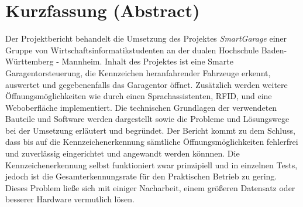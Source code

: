 \chapter*{Kurzfassung (Abstract)}

Der Projektbericht behandelt die Umsetzung des Projektes \textit{SmartGarage} einer Gruppe von Wirtschaftsinformatikstudenten an der dualen Hochschule Baden-Württemberg - Mannheim.
Inhalt des Projektes ist eine Smarte Garagentorsteuerung, die Kennzeichen heranfahrender Fahrzeuge erkennt, auswertet und gegebenenfalls das Garagentor öffnet. Zusätzlich werden weitere Öffnungsmöglichkeiten wie durch einen Sprachassistenten, RFID, und eine Weboberfläche implementiert. Die technischen Grundlagen der verwendeten Bauteile und Software werden dargestellt sowie die Probleme und Lösungswege bei der Umsetzung erläutert und begründet. \newline 
Der Bericht kommt zu dem Schluss, dass bis auf die Kennzeichenerkennung sämtliche Öffnungsmöglichkeiten fehlerfrei und zuverlässig eingerichtet und angewandt werden könnnen. Die Kennzeichenerkennung selbst funktioniert zwar prinzipiell und in einzelnen Tests, jedoch ist die Gesamterkennungsrate für den Praktischen Betrieb zu gering. Dieses Problem ließe sich mit einiger Nacharbeit, einem größeren Datensatz oder besserer Hardware vermutlich lösen.

